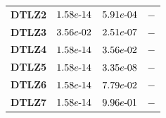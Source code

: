 \documentclass{article}
\begin{document}
\begin{table}[!htp]
\begin{tiny}
\begin{tabular}{c|ccc}
\textbf{DTLZ2} & $\cellcolor{gray25} 1.58e\makebox[0.1cm]{-}14 $ & $ \cellcolor{gray25} 5.91e\makebox[0.1cm]{-}04 $ & $ -$ \\
\textbf{DTLZ3} & $\cellcolor{gray25} 3.56e\makebox[0.1cm]{-}02 $ & $ \cellcolor{gray25} 2.51e\makebox[0.1cm]{-}07 $ & $ -$ \\
\textbf{DTLZ4} & $\cellcolor{gray25} 1.58e\makebox[0.1cm]{-}14 $ & $ \cellcolor{gray25} 3.56e\makebox[0.1cm]{-}02 $ & $ -$ \\
\textbf{DTLZ5} & $\cellcolor{gray25} 1.58e\makebox[0.1cm]{-}14 $ & $ \cellcolor{gray25} 3.35e\makebox[0.1cm]{-}08 $ & $ -$ \\
\textbf{DTLZ6} & $\cellcolor{gray25} 1.58e\makebox[0.1cm]{-}14 $ & $ 7.79e\makebox[0.1cm]{-}02 $ & $ -$ \\
\textbf{DTLZ7} & $\cellcolor{gray25} 1.58e\makebox[0.1cm]{-}14 $ & $ 9.96e\makebox[0.1cm]{-}01 $ & $ -$ \\
  \hline
  \end{tabular}
  \end{tiny}
\end{table}
\end{document}
